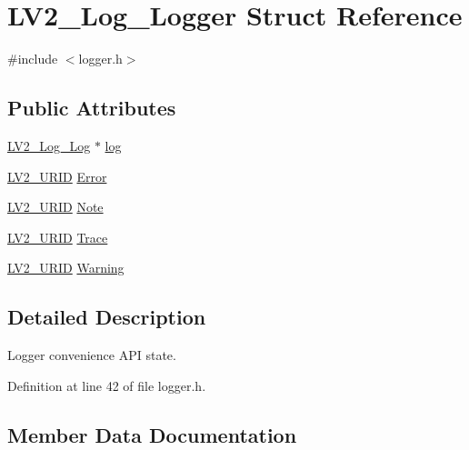 \hypertarget{struct_l_v2___log___logger}{}\section{L\+V2\+\_\+\+Log\+\_\+\+Logger Struct Reference}
\label{struct_l_v2___log___logger}


{\ttfamily \#include $<$logger.\+h$>$}

\subsection*{Public Attributes}
\begin{DoxyCompactItemize}
\item 
\hyperlink{lv2_2lv2_2lv2_2lv2plug_8in_2ns_2ext_2log_2log_8h_a80f0e839a976477f3133ca6353a42bbc}{L\+V2\+\_\+\+Log\+\_\+\+Log} $\ast$ \hyperlink{struct_l_v2___log___logger_ae41b7d6dcc4c121d26ad44381ac4a01e}{log}
\item 
\hyperlink{urid_8h_a5ff0630d245539e9f6dca10ff3c40fae}{L\+V2\+\_\+\+U\+R\+ID} \hyperlink{struct_l_v2___log___logger_a8ee0b4914dad87a7471104150048ee25}{Error}
\item 
\hyperlink{urid_8h_a5ff0630d245539e9f6dca10ff3c40fae}{L\+V2\+\_\+\+U\+R\+ID} \hyperlink{struct_l_v2___log___logger_a62226aa57fb6c0aa7c61bb296eaa6a9f}{Note}
\item 
\hyperlink{urid_8h_a5ff0630d245539e9f6dca10ff3c40fae}{L\+V2\+\_\+\+U\+R\+ID} \hyperlink{struct_l_v2___log___logger_a7c7e90e1c41a9ca6a36c843f40dc5662}{Trace}
\item 
\hyperlink{urid_8h_a5ff0630d245539e9f6dca10ff3c40fae}{L\+V2\+\_\+\+U\+R\+ID} \hyperlink{struct_l_v2___log___logger_a28cfedfc0ad8dc71598a5cbe68801ff1}{Warning}
\end{DoxyCompactItemize}


\subsection{Detailed Description}
Logger convenience A\+PI state. 

Definition at line 42 of file logger.\+h.



\subsection{Member Data Documentation}
